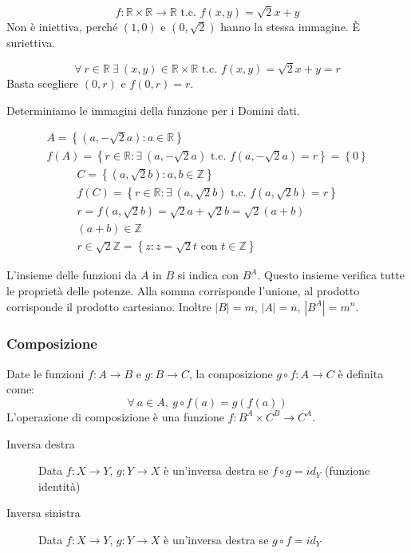 \[
f: \mathbb{R} \times \mathbb{R} \to \mathbb{R} \text{ t.c. } f(x,y) = \sqrt{2}x + y
\] 
Non \`e iniettiva, perch\'e $(1,0)$ e $(0,\sqrt{2})$ hanno la stessa immagine. \`E suriettiva.

\[
\forall \ r \in \mathbb{R} \ \exists \ (x,y) \in \mathbb{R} \times \mathbb{R} \text{ t.c. } f(x,y) = \sqrt{2} x + y = r
\]
Basta scegliere $(0,r)$ e $f(0,r) = r$.

Determiniamo le immagini della funzione per i Domini dati.

\begin{gather*}
A = \left\{ \left( a, - \sqrt{2}a\right) : a \in \mathbb{R}  \right\} \\
f(A) = \left\{ r \in \mathbb{R} : \exists \ (a, - \sqrt{2}a) \text{ t.c. } f(a, - \sqrt{2} a) = r \right\} = \left\{ 0 \right\}
\end{gather*}
\begin{gather*}
C = \left\{ (a, \sqrt{2} b) : a, b \in \mathbb{Z} \right\} \\
f(C) = \left\{ r \in \mathbb{R} : \exists \ (a, \sqrt{2} b) \text{ t.c. } f(a, \sqrt{2}b) = r \right\} \\
r = f(a, \sqrt{2} b) = \sqrt{2} a + \sqrt{2} b = \sqrt{2} (a + b) \\
(a+b) \in \mathbb{Z} \\
r \in \sqrt{2} \mathbb{Z} = \left\{z : z = \sqrt{2} t \text{ con } t \in \mathbb{Z} \right\}
\end{gather*}

L'insieme delle funzioni da $A$ in $B$ si indica con $B^A$. Questo insieme verifica tutte le propriet\`a delle potenze. Alla somma corrisponde l'unione, al prodotto corrisponde il prodotto cartesiano. Inoltre $|B| = m$, $|A| = n$, $|B^A| = m^n$.

\subsubsection{Composizione}

Date le funzioni $f : A \to B$ e $g : B \to C$, la composizione $g \circ f : A \to C$ \`e definita come:
\[
\forall \ a \in A , \ {g \circ f}(a) = g(f(a))
\]
L'operazione di composizione \`e una funzione $f : B^A \times C^B \to C^A$.

\begin{description}
  \item[Inversa destra] Data $f : X \to Y$, $g : Y \to X$ \`e un'inversa destra se $f \circ g = id_Y$ (funzione identit\`a)
  \item[Inversa sinistra] Data $f : X \to Y$, $g : Y \to X$ \`e un'inversa destra se $g \circ f = id_Y$
\end{description}

